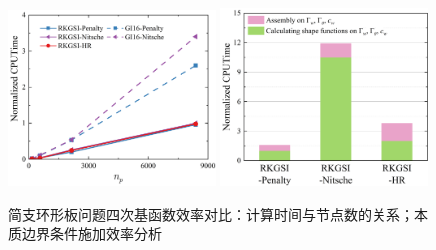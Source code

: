 \begin{figure}[H]
    \centering
    \begin{subcaptiongroup}
    \includegraphics[width=0.49\textwidth]{figure/PHR/A/Qcputime.png}
    \label{Qcputime}
    \includegraphics[width=0.49\textwidth]{figure/PHR/A/Qefficiency.png}
    \label{Qefficiency}
    \end{subcaptiongroup}
\caption{简支环形板问题四次基函数效率对比：计算时间与节点数的关系；本质边界条件施加效率分析}
\label{AQcputime}
\end{figure}
